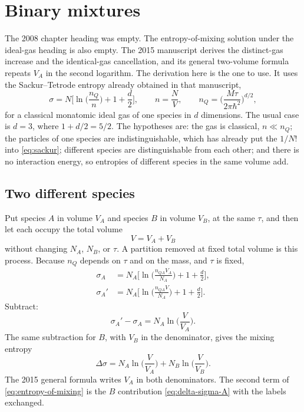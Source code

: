 \section{Binary mixtures}
\label{sec:binary-mixtures}

The 2008 chapter heading was empty. The entropy-of-mixing solution under the ideal-gas heading is also empty. The 2015 manuscript derives the distinct-gas increase and the identical-gas cancellation, and its general two-volume formula repeats \(V_A\) in the second logarithm. The derivation here is the one to use. It uses the Sackur--Tetrode entropy already obtained in that manuscript,
\begin{equation}
\label{eq:sackur}
\sigma = N\Biggl[\ln\biggl(\frac{n_Q}{n}\biggr) + 1 + \frac{d}{2}\Biggr],
\qquad
n = \frac{N}{V},
\qquad
n_Q = \biggl(\frac{M\tau}{2\pi\hbar^2}\biggr)^{d/2},
\end{equation}
for a classical monatomic ideal gas of one species in \(d\) dimensions. The usual case is \(d=3\), where \(1 + d/2 = 5/2\). The hypotheses are: the gas is classical, \(n\ll n_Q\); the particles of one species are indistinguishable, which has already put the \(1/N!\) into \eqref{eq:sackur}; different species are distinguishable from each other; and there is no interaction energy, so entropies of different species in the same volume add.

\subsection{Two different species}

Put species \(A\) in volume \(V_A\) and species \(B\) in volume \(V_B\), at the same \(\tau\), and then let each occupy the total volume
\begin{equation}
V = V_A + V_B
\end{equation}
without changing \(N_A\), \(N_B\), or \(\tau\). A partition removed at fixed total volume is this process. Because \(n_Q\) depends on \(\tau\) and on the mass, and \(\tau\) is fixed,
\begin{align}
\sigma_A
&= N_A\Biggl[\ln\biggl(\frac{n_{QA} V_A}{N_A}\biggr) + 1 + \frac{d}{2}\Biggr], \nonumber\\
\sigma_A'
&= N_A\Biggl[\ln\biggl(\frac{n_{QA} V}{N_A}\biggr) + 1 + \frac{d}{2}\Biggr].
\label{eq:sigma-A-before-after}
\end{align}
Subtract:
\begin{equation}
\label{eq:delta-sigma-A}
\sigma_A' - \sigma_A = N_A \ln\biggl(\frac{V}{V_A}\biggr).
\end{equation}
The same subtraction for \(B\), with \(V_B\) in the denominator, gives the mixing entropy
\begin{equation}
\label{eq:entropy-of-mixing}
\Delta\sigma
= N_A\ln\biggl(\frac{V}{V_A}\biggr) + N_B\ln\biggl(\frac{V}{V_B}\biggr).
\end{equation}
The 2015 general formula writes \(V_A\) in both denominators. The second term of \eqref{eq:entropy-of-mixing} is the \(B\) contribution \eqref{eq:delta-sigma-A} with the labels exchanged.

